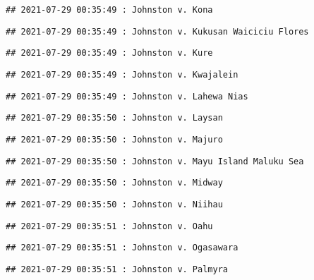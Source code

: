 \documentclass[
]{article}
\begin{document}
\begin{verbatim}
## 2021-07-29 00:35:49 : Johnston v. Kona
\end{verbatim}

\begin{verbatim}
## 2021-07-29 00:35:49 : Johnston v. Kukusan Waiciciu Flores
\end{verbatim}

\begin{verbatim}
## 2021-07-29 00:35:49 : Johnston v. Kure
\end{verbatim}

\begin{verbatim}
## 2021-07-29 00:35:49 : Johnston v. Kwajalein
\end{verbatim}

\begin{verbatim}
## 2021-07-29 00:35:49 : Johnston v. Lahewa Nias
\end{verbatim}

\begin{verbatim}
## 2021-07-29 00:35:50 : Johnston v. Laysan
\end{verbatim}

\begin{verbatim}
## 2021-07-29 00:35:50 : Johnston v. Majuro
\end{verbatim}

\begin{verbatim}
## 2021-07-29 00:35:50 : Johnston v. Mayu Island Maluku Sea
\end{verbatim}

\begin{verbatim}
## 2021-07-29 00:35:50 : Johnston v. Midway
\end{verbatim}

\begin{verbatim}
## 2021-07-29 00:35:50 : Johnston v. Niihau
\end{verbatim}

\begin{verbatim}
## 2021-07-29 00:35:51 : Johnston v. Oahu
\end{verbatim}

\begin{verbatim}
## 2021-07-29 00:35:51 : Johnston v. Ogasawara
\end{verbatim}

\begin{verbatim}
## 2021-07-29 00:35:51 : Johnston v. Palmyra
\end{verbatim}
\end{document}
